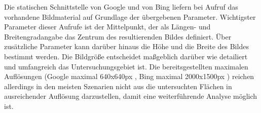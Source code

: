 Die statischen Schnittstelle von Google und von Bing liefern bei Aufruf das vorhandene Bildmaterial auf Grundlage der übergebenen Parameter. Wichtigster Parameter dieser Aufrufe ist der Mittelpunkt, der als Längen- und Breitengradangabe das Zentrum des resultierenden Bildes definiert. Über zusätzliche Parameter kann darüber hinaus die Höhe und die Breite des Bildes bestimmt werden. Die Bildgröße entscheidet maßgeblich darüber wie detailiert und umfangreich das Untersuchungsgebiet ist. Die bereitsgestellten maximalen Auflösungen (Google maximal 640x640px \cite{googleusagelimits}, Bing maximal 2000x1500px \cite{bingstaticmap}) reichen allerdings in den meisten Szenarien nicht aus die untersuchten Flächen in ausreichender Auflösung darzustellen, damit eine weiterführende Analyse möglich ist.\\

